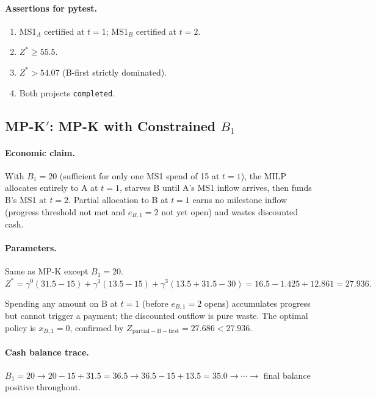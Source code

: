 \paragraph{Assertions for pytest.}
\begin{enumerate}[label=A\arabic*.]
  \item MS1$_A$ certified at $t=1$; MS1$_B$ certified at $t=2$.
  \item $Z^*\geq55.5$.
  \item $Z^*>54.07$ (B-first strictly dominated).
  \item Both projects \texttt{completed}.
\end{enumerate}

\subsection{MP-K$'$: MP-K with Constrained $B_1$}

\paragraph{Economic claim.}
With $B_1=20$ (sufficient for only one MS1 spend of 15 at $t=1$),
the MILP allocates entirely to A at $t=1$, starves B until A's MS1
inflow arrives, then funds B's MS1 at $t=2$. Partial allocation to B
at $t=1$ earns no milestone inflow (progress threshold not met and
$e_{B,1}=2$ not yet open) and wastes discounted cash.

\paragraph{Parameters.} Same as MP-K except $B_1=20$.
\[
  Z^* = \gamma^0(31.5-15)+\gamma^1(13.5-15)+\gamma^3(13.5+31.5-30)
      = 16.5-1.425+12.861 = \mathbf{27.936}.
\]

\begin{notebox}
\NOTEH Spending any amount on B at $t=1$ (before $e_{B,1}=2$ opens)
accumulates progress but cannot trigger a payment; the discounted
outflow is pure waste. The optimal policy is $x_{B,1}=0$, confirmed
by $Z_{\mathrm{partial-B-first}}=27.686<27.936$.
\end{notebox}

\paragraph{Cash balance trace.}
$B_1=20 \to 20-15+31.5=36.5 \to 36.5-15+13.5=35.0 \to \cdots \to$
final balance positive throughout.

